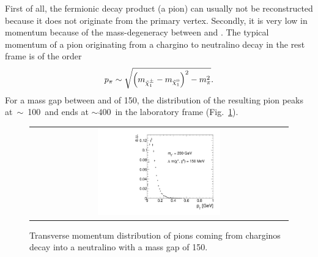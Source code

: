 First of all, the fermionic decay product (\eg a pion) can usually not be reconstructed because it does not originate from the primary vertex.
Secondly, it is very low in momentum because of the mass-degeneracy between \chipm and \chiO.
The typical momentum of a pion originating from a chargino to neutralino decay in the \chipm rest frame is of the order 
\begin{equation}
p_{\pi}\sim \sqrt{ \left( m_{\tilde{\chi}^{\pm}_{1}} - m_{\tilde{\chi}^{0}_{1}} \right)^2 - m_{\pi}^2}.
\end{equation}
For a mass gap between \chipm and \chiO of 150\mev, the \pt distribution of the resulting pion peaks \mbox{at $\sim$ 100\,\mev} and ends at \mbox{\pt $\sim 400\,$\mev} in the laboratory frame (Fig.~\ref{fig:ptOfPions}).
\begin{figure}[!t]
  \centering 
 \vspace{10pt}
  \begin{tabular}{c}
    \includegraphics[width=0.49\textwidth]{figures/analysis/PtOfPions.pdf}
  \end{tabular}
  \caption{Transverse momentum distribution of pions coming from charginos decay into a neutralino with a mass gap of 150\mev.}
  \label{fig:ptOfPions}
\vspace{80pt}
\end{figure} 

